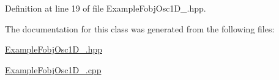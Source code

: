 \-Definition at line 19 of file \-Example\-Fobj\-Osc1\-D\-\_.\-hpp.



\-The documentation for this class was generated from the following files\-:\begin{DoxyCompactItemize}
\item 
\hyperlink{ExampleFobjOsc1D__1_8hpp}{\-Example\-Fobj\-Osc1\-D\-\_.\-hpp}\item 
\hyperlink{ExampleFobjOsc1D__1_8cpp}{\-Example\-Fobj\-Osc1\-D\-\_.\-cpp}\end{DoxyCompactItemize}
